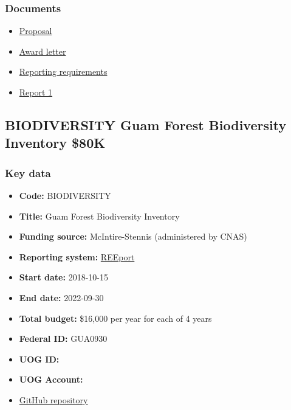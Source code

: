 \subsubsection{Documents}
\begin{itemize}
	\setlength\itemsep{0em}	
	\item \href{https://github.com/aubreymoore/2020-DOI-CRB-Biocontrol/blob/master/doi_proposal.pdf}{Proposal}
	\item \href{https://github.com/aubreymoore/2020-DOI-CRB-Biocontrol/blob/master/D20AP00060-Grant\%20Award\%20Document.pdf}{Award letter}
	\item \href{https://github.com/aubreymoore/2020-DOI-CRB-Biocontrol/raw/master/Reporting\%20requirements\%20\%20D17AP00107.pdf}{Reporting requirements}
	\item \href{https://github.com/aubreymoore/2020-DOI-CRB-Biocontrol/raw/master/doi_report1.pdf}{Report 1}
\end{itemize}

\newpage
\subsection{BIODIVERSITY Guam Forest Biodiversity Inventory \$80K}
\label{BIODIVERSITY}
\subsubsection{Key data}
\begin{itemize}
	\setlength\itemsep{0em}
	\item \textbf{Code:} BIODIVERSITY
	\item \textbf{Title:} Guam Forest Biodiversity Inventory
	\item \textbf{Funding source:} McIntire-Stennis (administered by CNAS)
	\item \textbf{Reporting system:} \href{https://portal.nifa.usda.gov/portal/front/login}{REEport}
	\item \textbf{Start date:} 2018-10-15
	\item \textbf{End date:} 2022-09-30
	\item \textbf{Total budget:} \$16,000 per year for each of 4 years
	\item \textbf{Federal ID:} GUA0930
	\item \textbf{UOG ID:}
	\item \textbf{UOG Account:}
	\item \href{https://github.com/aubreymoore/McIntire-Stennis}{GitHub repository}
\end{itemize}

